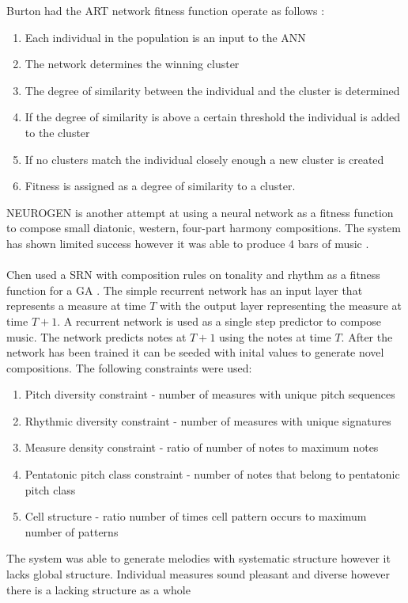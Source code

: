 Burton had the \ac{ART} network fitness function operate as follows \cite{Burton97geneticalgorithm}:
\begin{enumerate}
\item Each individual in the population is an input to the \ac{ANN}
\item The network determines the winning cluster
\item The degree of similarity between the individual and the cluster is determined
\item If the degree of similarity is above a certain threshold the individual is added to the cluster
\item If no clusters match the individual closely enough a new cluster is created
\item Fitness is assigned as a degree of similarity to a cluster. 
\end{enumerate}

NEUROGEN is another attempt at using a neural network as a fitness function to compose small diatonic, western, four-part harmony compositions.
The system has shown limited success however it was able to produce 4 bars of music \cite{gibson1991neurogen}.
\\
\\
Chen used a \ac{SRN} with composition rules on tonality and rhythm as a fitness function for a \ac{GA} \cite{Chen2001}. The simple recurrent network has an input layer that represents a measure at time $T$ with the output layer representing the measure at time $T+1$.
A recurrent network is used as a single step predictor to compose music. The network predicts notes at $T+1$ using the notes at time $T$. After the network has been trained it can be seeded with inital values to generate novel compositions.
The following constraints were used:
\begin{enumerate}
\item Pitch diversity constraint - number of measures with unique pitch sequences
\item Rhythmic diversity constraint - number of measures with unique signatures
\item Measure density constraint - ratio of number of notes to maximum notes
\item Pentatonic pitch class constraint - number of notes that belong to pentatonic pitch class
\item Cell structure - ratio number of times cell pattern occurs to maximum number of patterns 
\end{enumerate}
The system was able to generate melodies with systematic structure however it lacks global structure. Individual measures sound pleasant and diverse however there is a lacking structure as a whole


